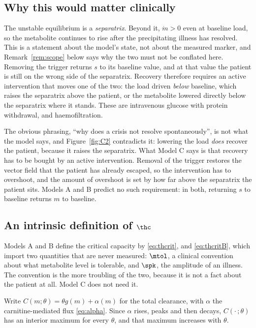 \subsection{Why this would matter clinically}

The unstable equilibrium is a \emph{separatrix}. Beyond it, $\dot m > 0$ even at baseline
load, so the metabolite continues to rise after the precipitating illness has resolved.
This is a statement about the model's state, not about the measured marker, and
Remark~\ref{rem:scope} below says why the two must not be conflated here.
Removing the trigger returns $s$ to its baseline value, and at that value the patient is
still on the wrong side of the separatrix. Recovery therefore requires an active intervention that moves one of the two: the load
driven \emph{below} baseline, which raises the separatrix above the patient, or the
metabolite lowered directly below the separatrix where it stands. These are intravenous
glucose with protein withdrawal, and haemofiltration.

\begin{remark}
The obvious phrasing, ``why does a crisis not resolve spontaneously'', is not what the
model says, and Figure~\ref{fig:C2} contradicts it: lowering the load \emph{does} recover
the patient, because it raises the separatrix. What Model C says is that recovery has to be
bought by an active intervention. Removal of the trigger
restores the vector field that the patient has already escaped, so the intervention has to
overshoot, and the amount of overshoot is set by how far above the separatrix the patient
sits. Models A and B predict no such requirement: in both, returning $s$ to baseline
returns $m$ to baseline.
\end{remark}

\subsection{An intrinsic definition of $\thc$}
\label{sec:intrinsic}

Models A and B define the critical capacity by \eqref{eq:thcrit},
and \eqref{eq:thcritB}, which import two quantities that are never
measured: $\mtol$, a clinical convention about what metabolite level is tolerable, and
$\spk$, the amplitude of an illness. The convention is the more troubling of the two,
because it is not a fact about the patient at all. Model C does not need it.

Write $C(m;\theta) = \theta g(m) + \alpha(m)$ for the total clearance, with $\alpha$ the
carnitine-mediated flux \eqref{eq:alpha}. Since $\alpha$ rises, peaks and then decays,
$C(\cdot\,;\theta)$ has an interior maximum for every $\theta$, and that maximum increases
with $\theta$.

